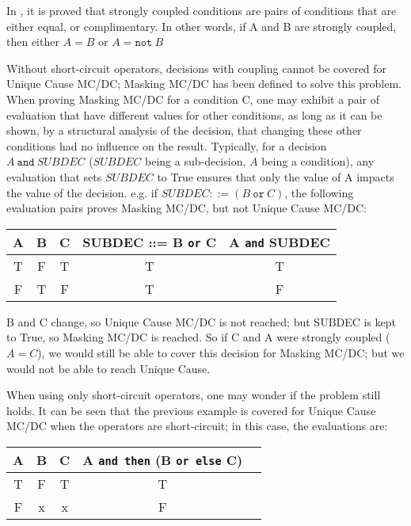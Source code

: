 \documentclass[a4paper,12pt,twoside]{article}
\newcommand{\andthen}{\texttt{and then}}
\newcommand{\orelse}{\texttt{or else}}
\newcommand{\adaand}{\texttt{and}}
\newcommand{\adaor}{\texttt{or}}
\newcommand{\adanot}{\texttt{not}}
\begin{document}
In \cite{rcdc-from}, it is proved that strongly coupled conditions
are pairs of conditions that are either equal, or complimentary.
In other words, if A and B are strongly coupled, then either $A = B$
or $A = \adanot{} \ B$

Without short-circuit operators, decisions with coupling cannot be
covered for Unique Cause MC/DC; Masking MC/DC has been defined to
solve this problem.  When proving Masking MC/DC for a condition C, one
may exhibit a pair of evaluation that have different values for other
conditions, as long as it can be shown, by a structural analysis of
the decision, that changing these other conditions had no influence
on the result. Typically, for a decision $A \ \adaand{} \ SUBDEC$ ($SUBDEC$
being a sub-decision, $A$ being a condition), any evaluation that sets
$SUBDEC$ to True ensures that only the value of A impacts the value of the
decision. e.g. if $SUBDEC ::= (B \ \adaor{} \ C)$, the following evaluation
pairs proves Masking MC/DC, but not Unique Cause MC/DC:

\begin{center}
\begin{tabular}{|c|c|c||c||c|}
\hline
A & B & C & SUBDEC ::= B \adaor{} C & A \adaand{} SUBDEC \\ \hline
T & F & T & T                       & T \\ \hline
F & T & F & T                       & F \\ \hline
\end{tabular}
\end{center}

B and C change, so Unique Cause MC/DC is not reached; but SUBDEC is kept
to True, so Masking MC/DC is reached. So if C and A were strongly
coupled ($A = C$), we would still be able to cover this decision for Masking
MC/DC; but we would not be able to reach Unique Cause.

When using only short-circuit operators, one may wonder if the problem
still holds. It can be seen that the previous example is covered for Unique
Cause MC/DC when the operators are short-circuit; in this case, the
evaluations are:

\begin{center}
\begin{tabular}{|c|c|c||c||c|}
\hline
A & B & C & A \andthen{} (B \orelse{} C) \\ \hline
T & F & T & T \\ \hline
F & x & x & F \\ \hline
\end{tabular}
\end{center}
\end{document}
